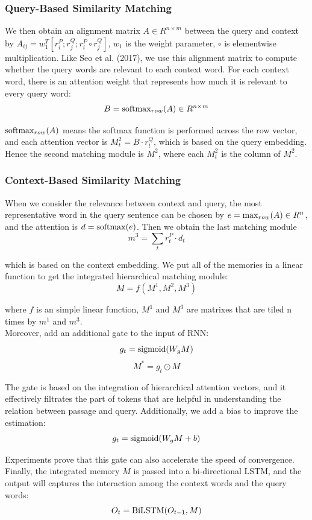 \documentclass[letterpaper]{article}
\begin{document}
\subsubsection{Query-Based Similarity Matching}
We then obtain an alignment matrix $A \in R^{n \times m}$ between the query and context by $A_{ij} = w_{1}^{T}[r^{P}_{i};r^{Q}_{j};r^{P}_{i} \circ r^{Q}_{j}]$, $w_1$ is the weight parameter, $\circ$ is elementwise multiplication. Like Seo et al. (2017), we use this alignment matrix to compute whether the query words are relevant to each context word. For each context word, there is an attention weight that represents how much it is relevant to every query word:
$$B = {\rm softmax}_{row} (A) \in R^{n \times m}$$

${\rm softmax}_{row}(A)$ means the softmax function is performed across the row vector, and each attention vector is $M^{2}_t= B \cdot r^{Q}_{t} $, which is based on the query embedding. Hence the second matching module is $M^2$, where each $M^{2}_t$ is the column of $M^2$.\\

\subsubsection{Context-Based Similarity Matching}
When we consider the relevance between context and query, the most representative word in the query sentence can be chosen by $e = {\rm max}_{row}(A) \in R^{n} $, and the attention is $d = {\rm softmax}(e)$. Then we obtain the last matching module
$$m^{3} = \sum_{t} r^{P}_{t}  \cdot d_t$$

which is based on the context embedding. We put all of the memories in a linear function to get the integrated hierarchical matching module:
$$M = f(M^1, M^2, M^3)$$

where $f$ is an simple linear function, $M^1$ and $M^3$ are matrixes that are tiled n times by $m^1$ and $m^3$. \\

Moreover, \cite{rnet} add an additional gate to the input of RNN:
$$g_t = {\rm sigmoid} (W_g M)$$
$$M^{*} = g_t \odot M$$

The gate is based on the integration of hierarchical attention vectors, and it effectively filtrates the part of tokens that are helpful in understanding the relation between passage and query. Additionally, we add a bias to improve the estimation:
$$g_t = {\rm sigmoid} (W_g M + b)$$

Experiments prove that this gate can also accelerate the speed of convergence. Finally, the integrated memory $M$ is passed into a bi-directional LSTM, and the output will captures the interaction among the context words and the query words:
$$O_t = {\rm BiLSTM} (O_{t-1}, M)$$
\end{document}
